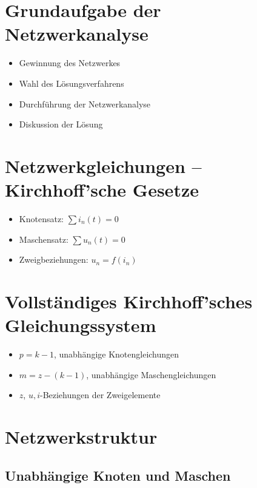\documentclass[
  ngerman,
  letterpaper,
]{scrbook}
\begin{document}
\section{Grundaufgabe der
Netzwerkanalyse}\label{grundaufgabe-der-netzwerkanalyse}

\begin{itemize}
\item
  Gewinnung des Netzwerkes
\item
  Wahl des Lösungsverfahrens
\item
  Durchführung der Netzwerkanalyse
\item
  Diskussion der Lösung
\end{itemize}

\section{Netzwerkgleichungen -- Kirchhoff'sche
Gesetze}\label{netzwerkgleichungen-kirchhoffsche-gesetze}

\begin{itemize}
\item
  Knotensatz: \(\sum i_n(t)=0\)
\item
  Maschensatz: \(\sum u_n(t)=0\)
\item
  Zweigbeziehungen: \(u_n = f(i_n)\)
\end{itemize}

\section{Vollständiges Kirchhoff'sches
Gleichungssystem}\label{vollstuxe4ndiges-kirchhoffsches-gleichungssystem}

\begin{itemize}
\item
  \(p=k-1\), unabhängige Knotengleichungen
\item
  \(m=z-(k-1)\), unabhängige Maschengleichungen
\item
  \(z\), \(u,i\)-Beziehungen der Zweigelemente
\end{itemize}

\section{Netzwerkstruktur}\label{netzwerkstruktur}

\subsection{Unabhängige Knoten und
Maschen}\label{unabhuxe4ngige-knoten-und-maschen}
\end{document}
